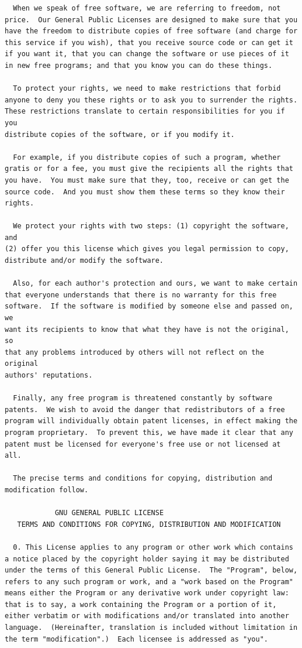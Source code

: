 \documentclass[mingoth,a4paper]{jsarticle}
\begin{document}
{{{{{\begin{multicols}{2}
\begin{fontsize}{6}{6}
\begin{verbatim}
  When we speak of free software, we are referring to freedom, not
price.  Our General Public Licenses are designed to make sure that you
have the freedom to distribute copies of free software (and charge for
this service if you wish), that you receive source code or can get it
if you want it, that you can change the software or use pieces of it
in new free programs; and that you know you can do these things.

  To protect your rights, we need to make restrictions that forbid
anyone to deny you these rights or to ask you to surrender the rights.
These restrictions translate to certain responsibilities for you if you
distribute copies of the software, or if you modify it.

  For example, if you distribute copies of such a program, whether
gratis or for a fee, you must give the recipients all the rights that
you have.  You must make sure that they, too, receive or can get the
source code.  And you must show them these terms so they know their
rights.

  We protect your rights with two steps: (1) copyright the software, and
(2) offer you this license which gives you legal permission to copy,
distribute and/or modify the software.

  Also, for each author's protection and ours, we want to make certain
that everyone understands that there is no warranty for this free
software.  If the software is modified by someone else and passed on, we
want its recipients to know that what they have is not the original, so
that any problems introduced by others will not reflect on the original
authors' reputations.

  Finally, any free program is threatened constantly by software
patents.  We wish to avoid the danger that redistributors of a free
program will individually obtain patent licenses, in effect making the
program proprietary.  To prevent this, we have made it clear that any
patent must be licensed for everyone's free use or not licensed at all.

  The precise terms and conditions for copying, distribution and
modification follow.

            GNU GENERAL PUBLIC LICENSE
   TERMS AND CONDITIONS FOR COPYING, DISTRIBUTION AND MODIFICATION

  0. This License applies to any program or other work which contains
a notice placed by the copyright holder saying it may be distributed
under the terms of this General Public License.  The "Program", below,
refers to any such program or work, and a "work based on the Program"
means either the Program or any derivative work under copyright law:
that is to say, a work containing the Program or a portion of it,
either verbatim or with modifications and/or translated into another
language.  (Hereinafter, translation is included without limitation in
the term "modification".)  Each licensee is addressed as "you".


\end{verbatim}
\end{fontsize}
\end{multicols}}}}}}
\end{document}
